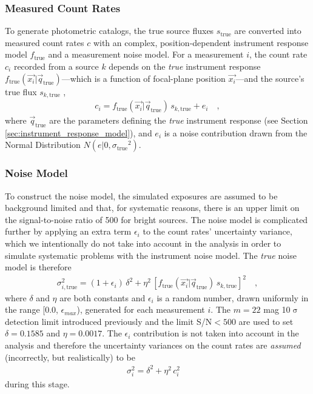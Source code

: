 \documentclass[preprint,pdftex]{aastex}
\newcommand{\true}{\text{true}}
\begin{document}
\subsubsection{Measured Count Rates}
To generate photometric catalogs, the true source fluxes $s_\true$ are converted into measured count rates $c$ with an complex, position-dependent instrument response model $f_\true$ and a measurement noise model. For a measurement $i$, the count rate $c_i$ recorded from a source $k$ depends on the \textit{true} instrument response $f_{\true}(\vec{x_i} | \vec{q}_\true)$---which is a function of focal-plane position $\vec{x_i}$---and the source's true flux $s_{k,\true}$ ,
\begin{eqnarray*}
c_i = f_{\true}(\vec{x_i} | \vec{q}_\true) \, s_{k, \true} + e_{i} \quad ,
\end{eqnarray*}
where $\vec{q}_\true$ are the parameters defining the \textit{true} instrument response (see Section \ref{sec:instrument_response_model}), and $e_i$ is a noise contribution drawn from the Normal Distribution $N(e|0,{\sigma_\true}^2)$. 

\subsubsection{Noise Model}
\label{sec:noise}
To construct the noise model, the simulated exposures are assumed to be background limited and that, for systematic reasons, there is an upper limit on the signal-to-noise ratio of 500 for bright sources. The noise model is complicated further by applying an extra term $\epsilon_i$ to the count rates' uncertainty variance, which we intentionally do not take into account in the analysis in order to simulate systematic problems with the instrument noise model. The \textit{true} noise model is therefore
\begin{eqnarray}
\sigma_{i, \true}^{2} = (1 + \epsilon_i) \, \delta^{2} + \eta^{2}\, [ f_\true(\vec{x_i} | \vec{q}_\true) \, s_{k, \true} ]^2 \quad , \label{eqn:noise}
\end{eqnarray}
where $\delta$ and $\eta$ are both constants and $\epsilon_i$ is a random number, drawn uniformly in the range [0.0, $\epsilon_{max}$), generated for each measurement $i$. The $m = 22$ mag 10$\upsigma$ detection limit introduced previously and the limit S/N$<500$ are used to set $\delta = 0.1585$ and $\eta = 0.0017$. The $\epsilon_i$ contribution is not taken into account in the analysis and therefore the uncertainty variances on the count rates are \textit{assumed} (incorrectly, but realistically) to be
\begin{eqnarray*}
\sigma_{{i}}^{2} = \delta^{2} + \eta^{2} \, c^{2}_i \quad 
\end{eqnarray*}
during this stage. 
\end{document}
